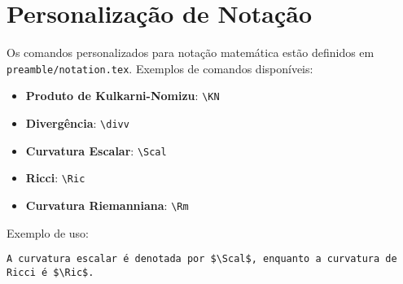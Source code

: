 \documentclass[a4paper,12pt]{article}
\begin{document}
\section*{Personalização de Notação}

Os comandos personalizados para notação matemática estão definidos em \texttt{preamble/notation.tex}. Exemplos de comandos disponíveis:

\begin{itemize}
    \item \textbf{Produto de Kulkarni-Nomizu}: \texttt{\textbackslash KN}
    \item \textbf{Divergência}: \texttt{\textbackslash divv}
    \item \textbf{Curvatura Escalar}: \texttt{\textbackslash Scal}
    \item \textbf{Ricci}: \texttt{\textbackslash Ric}
    \item \textbf{Curvatura Riemanniana}: \texttt{\textbackslash Rm}
\end{itemize}

Exemplo de uso:
\begin{verbatim}
A curvatura escalar é denotada por $\Scal$, enquanto a curvatura de Ricci é $\Ric$.
\end{verbatim}
\end{document}

